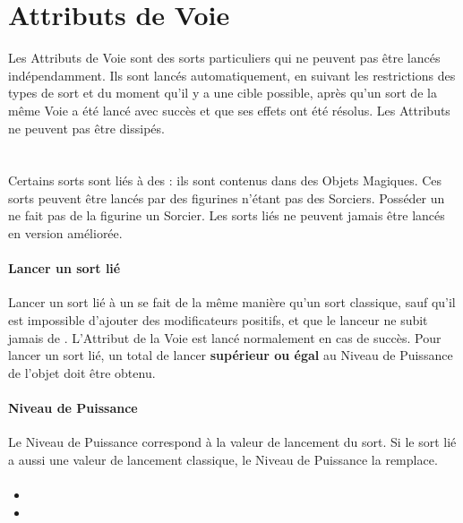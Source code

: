 \section{Attributs de Voie}

Les Attributs de Voie sont des sorts particuliers qui ne peuvent pas être lancés indépendamment. Ils sont lancés automatiquement, en suivant les restrictions des types de sort et du moment qu'il y a une cible possible, après qu'un sort de la même Voie a été lancé avec succès et que ses effets ont été résolus. Les Attributs ne peuvent pas être dissipés.

\newpage
\section{\boundspell{}}

Certains sorts sont liés à des \boundspells{} : ils sont contenus dans des Objets Magiques. Ces sorts peuvent être lancés par des figurines n'étant pas des Sorciers. Posséder un \boundspell{} ne fait pas de la figurine un Sorcier. Les sorts liés ne peuvent jamais être lancés en version améliorée.

\paragraph{Lancer un sort lié}

Lancer un sort lié à un \boundspell{} se fait de la même manière qu'un sort classique, sauf qu'il est impossible d'ajouter des modificateurs positifs, et que le lanceur ne subit jamais de \lostfocus{}. L'Attribut de la Voie est lancé normalement en cas de succès. Pour lancer un sort lié, un total de lancer \textbf{supérieur ou égal} au Niveau de Puissance de l'objet doit être obtenu.

\paragraph{Niveau de Puissance}

Le Niveau de Puissance correspond à la valeur de lancement du sort. Si le sort lié a aussi une valeur de lancement classique, le Niveau de Puissance la remplace.

\paragraph{\overwhelmingpower}

\begin{itemize}[label={-}]
\item {}
\item {}
\end{itemize}


